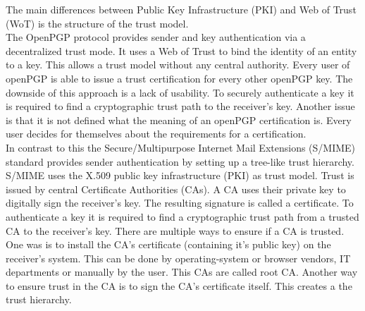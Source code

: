 The main differences between Public Key Infrastructure (PKI) and Web of Trust (WoT) is the structure of the trust model.  \\

The OpenPGP protocol provides sender and key authentication via a decentralized trust mode. It uses a Web of Trust to bind the identity of an entity to a key. This allows a trust model without any central authority. Every user of openPGP is able to issue a trust certification for every other openPGP key. The downside of this approach is a lack of usability. To securely authenticate a key it is required to find a cryptographic trust path to the receiver's key. Another issue is that it is not defined what the meaning of an openPGP certification is. Every user decides for themselves about the requirements for a certification. \\

In contrast to this the Secure/Multipurpose Internet Mail Extensions (S/MIME) standard provides sender authentication by setting up a tree-like trust hierarchy. S/MIME uses the X.509 public key infrastructure (PKI) as trust model. Trust is issued by central Certificate Authorities (CAs). A CA uses their private key to digitally sign the receiver's key. The resulting signature is called a certificate. To authenticate a key it is required to find a cryptographic trust path from a trusted CA to the receiver's key. There are multiple ways to ensure if a CA is trusted. One was is to install the CA's certificate (containing it's public key) on the receiver's system. This can be done by operating-system or browser vendors, IT departments or manually by the user. This CAs are called root CA. Another way to ensure trust in the CA is to sign the CA's certificate itself. This creates a the trust hierarchy. 

